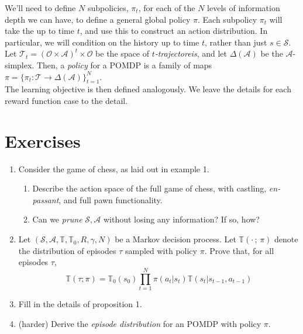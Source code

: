 \documentclass[12pt]{article}
\begin{document}
We'll need to define $N$ subpolicies, $\pi_t$, for each of the $N$ levels of information depth we can have, to define 
a general global policy $\pi$. Each subpolicy $\pi_t$ will take the up to time $t$, and use this to construct an action 
distribution. In particular, we will condition on the history up to time $t$, rather than just $s \in \mathcal{S}$. Let 
$\mathcal{T}_t = (\mathcal{O} \times \mathcal{A})^t \times \mathcal{O}$ be the space of $t$\textit{-trajectoreis}, and let $\Delta(
\mathcal{A})$ be the $\mathcal{A}$-simplex. Then, a \textit{policy} for a POMDP is a family of maps $\pi = \{\pi_t: \mathcal{T} 
\to \Delta(\mathcal{A})\}_{t=1}^N$.  \\

The learning objective is then defined analogously. We leave the details for each reward function case to the detail.

\section{Exercises}

\begin{enumerate}
    \item Consider the game of chess, as laid out in example 1. 
    \begin{enumerate}
        \item Describe the action space of the full game of chess, with castling, \textit{en-passant}, and full pawn functionality. 
        \item Can we \textit{prune} $\mathcal{S}, \mathcal{A}$ without losing any information? If so, how? 
    \end{enumerate}
    \item Let $(\mathcal{S}, \mathcal{A}, \mathbb{T}, \mathbb{T}_0, R, \gamma, N)$ be a Markov decision process. Let 
    $\mathbb{T}(\cdot \, ; \, \pi)$ denote the distribution of episodes $\tau$ sampled with policy $\pi$. Prove that, for 
    all episodes $\tau$, 
    $$
    \mathbb{T}(\tau ; \pi) = \mathbb{T}_0(s_0)\prod_{t=1}^N \pi(a_t | s_t)\mathbb{T}(s_t | s_{t-1}, a_{t-1})
    $$ 
    \item Fill in the details of proposition 1.
    \item (harder) Derive the \textit{episode distribution} for an POMDP with policy $\pi$.
\end{enumerate}



\end{document}
